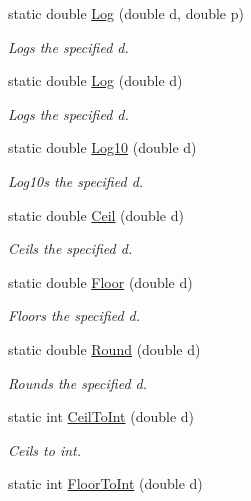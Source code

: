 \begin{DoxyCompactItemize}
static double \hyperlink{struct_unity_engine_1_1_mathd_a20eb8c95a64e38dd92b0d9a15507041a}{Log} (double d, double p)
\begin{DoxyCompactList}\small\item\em Logs the specified d. \end{DoxyCompactList}\item 
static double \hyperlink{struct_unity_engine_1_1_mathd_a4708a8e01e08dafe6f8633ef16699090}{Log} (double d)
\begin{DoxyCompactList}\small\item\em Logs the specified d. \end{DoxyCompactList}\item 
static double \hyperlink{struct_unity_engine_1_1_mathd_a11b15e593212dfc59039aaefd6ab0afd}{Log10} (double d)
\begin{DoxyCompactList}\small\item\em Log10s the specified d. \end{DoxyCompactList}\item 
static double \hyperlink{struct_unity_engine_1_1_mathd_a4dbce6fe361ddc9d8a154d04ae40b022}{Ceil} (double d)
\begin{DoxyCompactList}\small\item\em Ceils the specified d. \end{DoxyCompactList}\item 
static double \hyperlink{struct_unity_engine_1_1_mathd_a451e35cc077fa5cad080d81159475a49}{Floor} (double d)
\begin{DoxyCompactList}\small\item\em Floors the specified d. \end{DoxyCompactList}\item 
static double \hyperlink{struct_unity_engine_1_1_mathd_a65d6708eb7dfac9261028e11c8ad0e87}{Round} (double d)
\begin{DoxyCompactList}\small\item\em Rounds the specified d. \end{DoxyCompactList}\item 
static int \hyperlink{struct_unity_engine_1_1_mathd_a0f248ef2890d088a213ca87c323f7977}{Ceil\+To\+Int} (double d)
\begin{DoxyCompactList}\small\item\em Ceils to int. \end{DoxyCompactList}\item 
static int \hyperlink{struct_unity_engine_1_1_mathd_a18ac2d0ed9be3f37f0f047903435a7de}{Floor\+To\+Int} (double d)

\end{DoxyCompactItemize}
